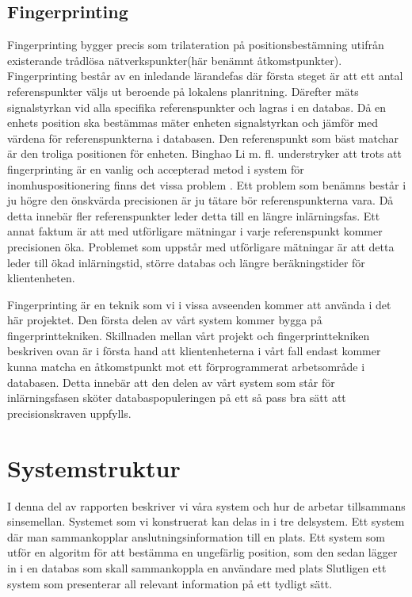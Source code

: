 \documentclass[swedish, a4paper,12pt]{article}
\begin{document}
\subsection{Fingerprinting}
Fingerprinting bygger precis som trilateration på positionsbestämning utifrån existerande trådlösa nätverkspunkter(här benämnt åtkomstpunkter). Fingerprinting består av en inledande lärandefas där första steget är att ett antal referenspunkter väljs ut beroende på lokalens planritning. Därefter mäts signalstyrkan vid alla specifika referenspunkter och lagras i en databas.%
Då en enhets position ska bestämmas mäter enheten signalstyrkan och jämför med värdena för referenspunkterna i databasen. Den referenspunkt som bäst matchar är den troliga positionen för enheten.\cite{IP1}\cite{jun2018low}
Binghao Li m. fl. understryker att trots att fingerprinting är en vanlig och accepterad metod i system för inomhuspositionering finns det vissa problem .\cite{IP1}
Ett problem som benämns består i ju högre den önskvärda precisionen är ju tätare bör referenspunkterna vara. Då detta innebär fler referenspunkter leder detta till en längre inlärningsfas. Ett annat faktum är att med utförligare mätningar i varje referenspunkt kommer precisionen öka. Problemet som uppstår med utförligare mätningar är att detta leder till ökad inlärningstid, större databas och längre beräkningstider för klientenheten.\cite{IP1}

Fingerprinting är en teknik som vi i vissa avseenden kommer att använda i det här projektet. Den första delen av vårt system kommer bygga på fingerprinttekniken. Skillnaden mellan vårt projekt och fingerprinttekniken beskriven ovan är i första hand att klientenheterna i vårt fall endast kommer kunna matcha en åtkomstpunkt mot ett förprogrammerat arbetsområde i databasen. Detta innebär att den delen av vårt system som står för inlärningsfasen sköter databaspopuleringen på ett så pass bra sätt att precisionskraven uppfylls.
\fi
\section{Systemstruktur}
I denna del av rapporten beskriver vi våra system och hur de arbetar tillsammans sinsemellan.
Systemet som vi konstruerat kan delas in i tre delsystem. Ett system där man sammankopplar anslutningsinformation till en plats. Ett system som utför en algoritm för att bestämma en ungefärlig position, som den sedan lägger in i en databas som skall sammankoppla en användare med plats Slutligen ett system som presenterar all relevant information på ett tydligt sätt.
\end{document}
